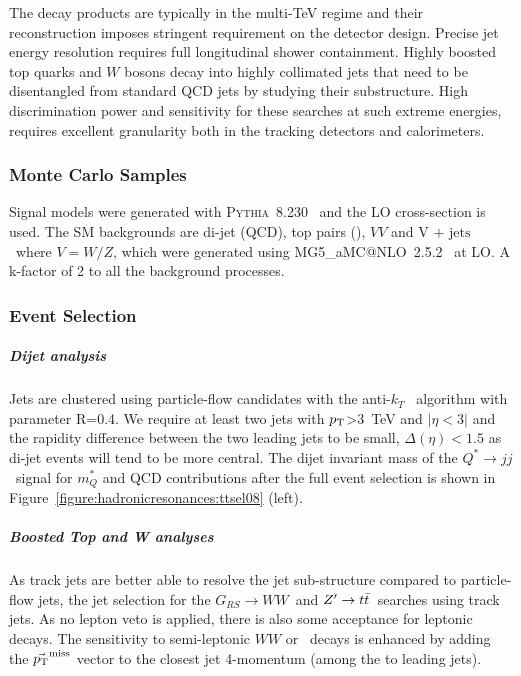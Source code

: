 \documentclass{cernrep}
\newcommand*{\zptt}{\ensuremath{Z^{\prime} \rightarrow \ttbar}}
\newcommand*{\qjj}{\ensuremath{Q^{*} \rightarrow jj}}
\newcommand*{\rsg}{\ensuremath{G_{RS} \rightarrow WW}}
\newcommand*{\vj}{\ensuremath{\text{V + jets}}}
\newcommand*{\metvec}{\vec{\pt}^{\textrm{miss}}}
\begin{document}
The decay products are typically in the multi-TeV regime and their reconstruction imposes stringent requirement on the detector design. Precise jet energy resolution requires full longitudinal shower containment. Highly boosted top quarks and $W$ bosons decay into highly collimated jets that need to  be disentangled from standard QCD jets by studying their substructure. High discrimination power and sensitivity for these searches at such extreme energies, requires excellent granularity both in the tracking detectors and calorimeters.

\subsubsection{Monte Carlo Samples}
Signal models were generated with {\scshape Pythia}~8.230~\cite{Sjostrand:2014zea} and the LO cross-section is used. The SM backgrounds are di-jet (QCD), top pairs (\ttbar), $VV$ and \vj\ where $V=W/Z$, which were generated using {\scshape MG5\_}a{\scshape MC@NLO}~2.5.2~\cite{Alwall:2014} at LO. A k-factor of 2 to all the background processes.

\subsubsection{Event Selection}

\subparagraph{Dijet analysis}

Jets are clustered using particle-flow candidates with the anti-$k_T$~\cite{Cacciari:2008gp} algorithm with parameter R=0.4. We require at least two jets with $p_{\text{T}}$>3~TeV and $|\eta<3|$ and the rapidity difference between the two leading jets to be small, $\Delta(\eta)<1.5$ as di-jet events will tend to be more central. The dijet invariant mass of the \qjj\ signal for $m_Q^{*}$ and QCD contributions after the full event selection is shown in Figure~\ref{figure:hadronicresonances:ttsel08} (left).

\subparagraph{Boosted Top and W analyses}

As track jets are better able to resolve the jet sub-structure compared to particle-flow jets, the jet selection for the \rsg\ and \zptt\ searches using track jets. As no lepton veto is applied, there is also some acceptance for leptonic decays. The sensitivity to semi-leptonic $WW$ or \ttbar\ decays is enhanced by adding the $\metvec$ vector to the closest jet 4-momentum (among the to leading jets).
\end{document}
